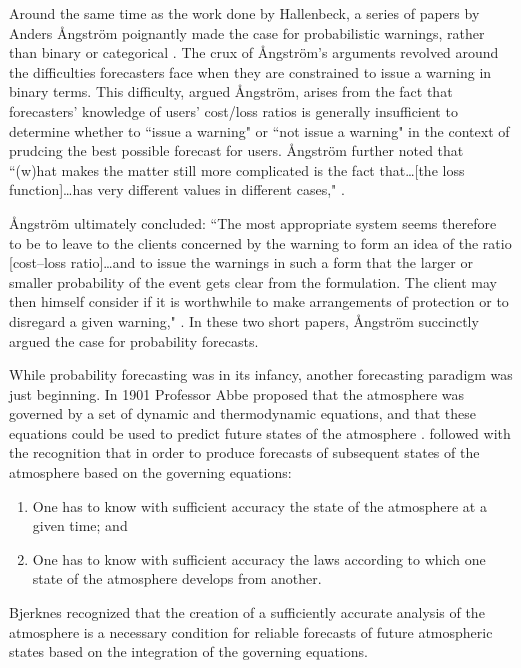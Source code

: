 Around the same time as the work done by Hallenbeck, a series of papers by Anders {{\AA}}ngstr{{\"o}}m poignantly made the case for probabilistic warnings, rather than binary or categorical \citep{Angstrom1919, Angstrom1922, Liljas1994, Murphy1998}.
The crux of {{\AA}}ngstr{{\"o}}m's arguments revolved around the difficulties forecasters face when they are constrained to issue a warning in binary terms.
This difficulty, argued {{\AA}}ngstr{{\"o}}m, arises from the fact that forecasters' knowledge of users' cost/loss ratios is generally insufficient to determine whether to ``issue a warning" or ``not issue a warning" in the context of prudcing the best possible forecast for users.
{{\AA}}ngstr{{\"o}}m further noted that ``(w)hat makes the matter still more complicated is the fact that\dots [the loss function]\dots has very different values in different cases," \cite{Angstrom1922, Murphy1998}.


{{\AA}}ngstr{{\"o}}m ultimately concluded: ``The most appropriate system seems therefore to be to leave to the clients concerned by the warning to form an idea of the ratio [cost–loss ratio]\dots and to issue the warnings in such a form that the larger or smaller probability of the event gets clear from the formulation.
The client may then himself consider if it is worthwhile to make arrangements of protection or to disregard a given warning," \cite{Angstrom1922, Murphy1998}.
In these two short papers, {{\AA}}ngstr{{\"o}}m succinctly argued the case for probability forecasts.





While probability forecasting was in its infancy, another forecasting paradigm was just beginning.
In 1901 Professor Abbe proposed that the atmosphere was governed by a set of dynamic and thermodynamic equations, and that these equations could be used to predict future states of the atmosphere \citep{Abbe1901}.
\cite{Bjerknes1904} followed with the recognition that in order to produce forecasts of subsequent states of the atmosphere based on the governing equations:
\begin{enumerate}
    \item One has to know with sufficient accuracy the state of the atmosphere at a given time; and
    \item One has to know with sufficient accuracy the laws according to which one state of the atmosphere develops from another.
\end{enumerate}
Bjerknes recognized that the creation of a sufficiently accurate analysis of the atmosphere is a necessary condition for reliable forecasts of future atmospheric states based on the integration of the governing equations.


